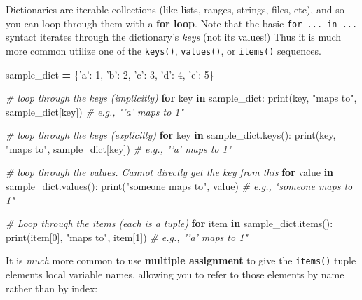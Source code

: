 \documentclass[]{book}
\newenvironment{Shaded}{\begin{snugshade}}{\end{snugshade}}
\newcommand{\KeywordTok}[1]{\textcolor[rgb]{0.13,0.29,0.53}{\textbf{#1}}}
\newcommand{\DecValTok}[1]{\textcolor[rgb]{0.00,0.00,0.81}{#1}}
\newcommand{\StringTok}[1]{\textcolor[rgb]{0.31,0.60,0.02}{#1}}
\newcommand{\CommentTok}[1]{\textcolor[rgb]{0.56,0.35,0.01}{\textit{#1}}}
\newcommand{\ControlFlowTok}[1]{\textcolor[rgb]{0.13,0.29,0.53}{\textbf{#1}}}
\newcommand{\OperatorTok}[1]{\textcolor[rgb]{0.81,0.36,0.00}{\textbf{#1}}}
\newcommand{\BuiltInTok}[1]{#1}
\newcommand{\NormalTok}[1]{#1}
\begin{document}
Dictionaries are iterable collections (like lists, ranges, strings,
files, etc), and so you can loop through them with a \textbf{for loop}.
Note that the basic \texttt{for\ ...\ in\ ...} syntact iterates through
the dictionary's \emph{keys} (not its values!) Thus it is much more
common utilize one of the \texttt{keys()}, \texttt{values()}, or
\texttt{items()} sequences.

\begin{Shaded}
\begin{Highlighting}[]
\NormalTok{sample_dict }\OperatorTok{=}\NormalTok{ \{}\StringTok{'a'}\NormalTok{: }\DecValTok{1}\NormalTok{, }\StringTok{'b'}\NormalTok{: }\DecValTok{2}\NormalTok{, }\StringTok{'c'}\NormalTok{: }\DecValTok{3}\NormalTok{, }\StringTok{'d'}\NormalTok{: }\DecValTok{4}\NormalTok{, }\StringTok{'e'}\NormalTok{: }\DecValTok{5}\NormalTok{\}}

\CommentTok{# loop through the keys (implicitly)}
\ControlFlowTok{for}\NormalTok{ key }\KeywordTok{in}\NormalTok{ sample_dict:}
    \BuiltInTok{print}\NormalTok{(key, }\StringTok{"maps to"}\NormalTok{, sample_dict[key])  }\CommentTok{# e.g., "'a' maps to 1"}

\CommentTok{# loop through the keys (explicitly)}
\ControlFlowTok{for}\NormalTok{ key }\KeywordTok{in}\NormalTok{ sample_dict.keys():}
    \BuiltInTok{print}\NormalTok{(key, }\StringTok{"maps to"}\NormalTok{, sample_dict[key])  }\CommentTok{# e.g., "'a' maps to 1"}

\CommentTok{# loop through the values. Cannot directly get the key from this}
\ControlFlowTok{for}\NormalTok{ value }\KeywordTok{in}\NormalTok{ sample_dict.values():}
    \BuiltInTok{print}\NormalTok{(}\StringTok{"someone maps to"}\NormalTok{, value)  }\CommentTok{# e.g., "someone maps to 1"}

\CommentTok{# Loop through the items (each is a tuple)}
\ControlFlowTok{for}\NormalTok{ item }\KeywordTok{in}\NormalTok{ sample_dict.items():}
    \BuiltInTok{print}\NormalTok{(item[}\DecValTok{0}\NormalTok{], }\StringTok{"maps to"}\NormalTok{, item[}\DecValTok{1}\NormalTok{])  }\CommentTok{# e.g., "'a' maps to 1"}
\end{Highlighting}
\end{Shaded}

It is \emph{much} more common to use \textbf{multiple assignment} to
give the \texttt{items()} tuple elements local variable names, allowing
you to refer to those elements by name rather than by index:
\end{document}
